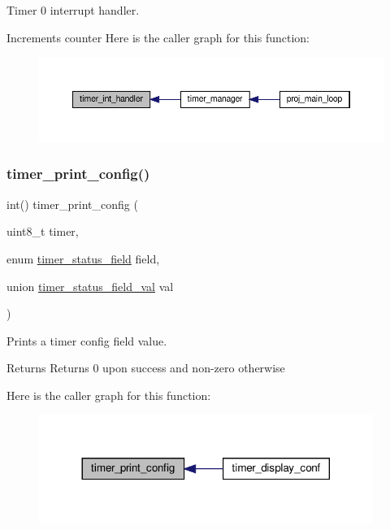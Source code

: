 Timer 0 interrupt handler. 

Increments counter Here is the caller graph for this function\+:
\nopagebreak
\begin{figure}[H]
\begin{center}
\leavevmode
\includegraphics[width=350pt]{group__timer_ga91a2072306c68353712a6b771287dc2c_icgraph}
\end{center}
\end{figure}
\mbox{\label{group__timer_gad3902e029b27c80982873394c0290496}} 
\subsubsection{\texorpdfstring{timer\+\_\+print\+\_\+config()}{timer\_print\_config()}}
{\footnotesize\ttfamily int() timer\+\_\+print\+\_\+config (\begin{DoxyParamCaption}\item[{uint8\+\_\+t}]{timer,  }\item[{enum \hyperlink{group__timer_gada782f3116a896caaa602b70c0c6d8b7}{timer\+\_\+status\+\_\+field}}]{field,  }\item[{union \hyperlink{uniontimer__status__field__val}{timer\+\_\+status\+\_\+field\+\_\+val}}]{val }\end{DoxyParamCaption})}



Prints a timer config field value. 

\begin{DoxyReturn}{Returns}
Returns 0 upon success and non-\/zero otherwise 
\end{DoxyReturn}
Here is the caller graph for this function\+:
\nopagebreak
\begin{figure}[H]
\begin{center}
\leavevmode
\includegraphics[width=308pt]{group__timer_gad3902e029b27c80982873394c0290496_icgraph}
\end{center}
\end{figure}
\mbox{\label{group__timer_ga43b221cba0c39b32f89688dcfee5aefa}} 
